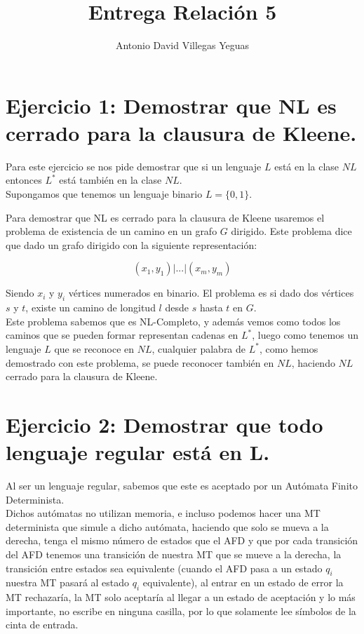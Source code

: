 \documentclass{article}
\title{Entrega Relación 5}
\author{Antonio David Villegas Yeguas}
\date{}
\begin{document}
\maketitle


\section*{Ejercicio 1: Demostrar que NL es cerrado para la clausura de Kleene.}

Para este ejercicio se nos pide demostrar que si un lenguaje $L$ está en la clase $NL$ entonces $L^*$ está también en la clase $NL$.\\

Supongamos que tenemos un lenguaje binario $L = \{0, 1\}$.

Para demostrar que NL es cerrado para la clausura de Kleene usaremos el problema de existencia de un camino en un grafo $G$ dirigido. Este problema dice que dado un grafo dirigido con la siguiente representación:

$$ (x_1, y_1)|...|(x_m, y_m) $$

Siendo $x_i$ y $y_i$ vértices numerados en binario. El problema es si dado dos vértices $s$ y $t$, existe un camino de longitud $l$ desde $s$ hasta $t$ en $G$. \\


Este problema sabemos que es NL-Completo, y además vemos como todos los caminos que se pueden formar representan cadenas en $L^*$, luego como tenemos un lenguaje $L$ que se reconoce en $NL$, cualquier palabra de $L^*$, como hemos demostrado con este problema, se puede reconocer también en $NL$, haciendo $NL$ cerrado para la clausura de Kleene.

\section*{Ejercicio 2: Demostrar que todo lenguaje regular está en L.}

	Al ser un lenguaje regular, sabemos que este es aceptado por un Autómata Finito Determinista. \\

Dichos autómatas no utilizan memoria, e incluso podemos hacer una MT determinista que simule a dicho autómata, haciendo que solo se mueva a la derecha, tenga el mismo número de estados que el AFD y que por cada transición del AFD tenemos una transición de nuestra MT que se mueve a la derecha, la transición entre estados sea equivalente (cuando el AFD pasa a un estado $q_i$ nuestra MT pasará al estado $q_i$ equivalente), al entrar en un estado de error la MT rechazaría, la MT solo aceptaría al llegar a un estado de aceptación y lo más importante, no escribe en ninguna casilla, por lo que solamente lee símbolos de la cinta de entrada.\\
\end{document}
